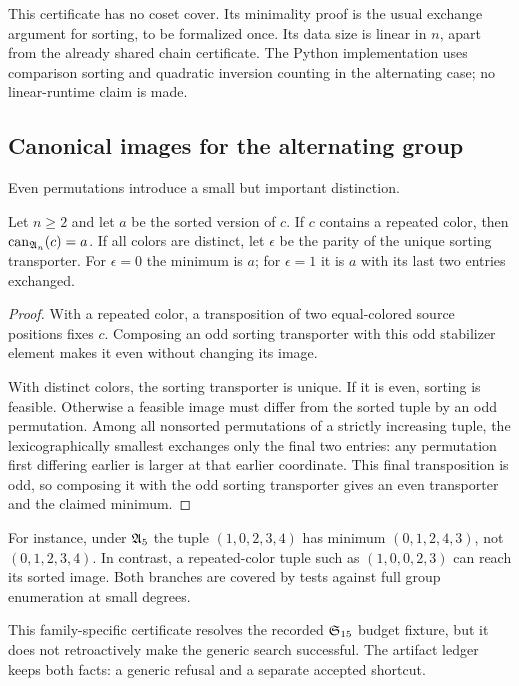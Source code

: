 This certificate has no coset cover. Its minimality proof is the usual exchange argument for sorting, to be formalized once. Its data size is linear in $n$, apart from the already shared chain certificate. The Python implementation uses comparison sorting and quadratic inversion counting in the alternating case; no linear-runtime claim is made.

\subsection{Canonical images for the alternating group}
Even permutations introduce a small but important distinction.

\begin{theorem}
\label{thm:alternating-image}
Let $n\geq2$ and let $a$ be the sorted version of $c$.
If $c$ contains a repeated color, then $\operatorname{can}_{\mathfrak A_n}(c)=a$.
If all colors are distinct, let $\epsilon$ be the parity of the unique sorting transporter. For $\epsilon=0$ the minimum is $a$; for $\epsilon=1$ it is $a$ with its last two entries exchanged.
\end{theorem}
\begin{proof}
With a repeated color, a transposition of two equal-colored source positions fixes $c$. Composing an odd sorting transporter with this odd stabilizer element makes it even without changing its image.

With distinct colors, the sorting transporter is unique. If it is even, sorting is feasible. Otherwise a feasible image must differ from the sorted tuple by an odd permutation. Among all nonsorted permutations of a strictly increasing tuple, the lexicographically smallest exchanges only the final two entries: any permutation first differing earlier is larger at that earlier coordinate. This final transposition is odd, so composing it with the odd sorting transporter gives an even transporter and the claimed minimum.
\end{proof}

For instance, under $\mathfrak A_5$ the tuple $(1,0,2,3,4)$ has minimum $(0,1,2,4,3)$, not $(0,1,2,3,4)$. In contrast, a repeated-color tuple such as $(1,0,0,2,3)$ can reach its sorted image. Both branches are covered by tests against full group enumeration at small degrees.

This family-specific certificate resolves the recorded $\mathfrak S_{15}$ budget fixture, but it does not retroactively make the generic search successful. The artifact ledger keeps both facts: a generic refusal and a separate accepted shortcut.
